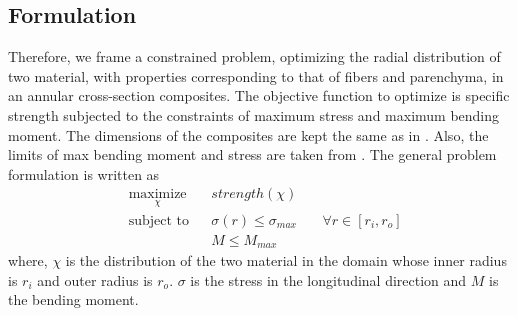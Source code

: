 \documentclass[10pt]{article}
\begin{document}
\subsection{Formulation}
Therefore, we frame a constrained problem, optimizing the radial distribution of two material, with properties corresponding to that of fibers and parenchyma, in an annular cross-section composites. The objective function to optimize is specific strength subjected to the constraints of maximum stress and maximum bending moment. The dimensions of the composites are kept the same as in \cite{mannan2018stiffness}. Also, the limits of max bending moment and stress are taken from \cite{mannan2018stiffness}. The general problem formulation is written as
\begin{equation*}
\begin{aligned}
& \underset{\chi}{\text{maximize}}
& & strength(\chi) \\
& \text{subject to}
& & \sigma(r) \leq \sigma_{max} &\quad \forall r \in [r_i, r_o]\\
& & & M \leq M_{max}
\end{aligned}
\end{equation*}
where, $\chi$ is the distribution of the two material in the domain whose inner radius is $r_i$ and outer radius is $r_o$.  $\sigma$ is the stress in the longitudinal direction and $M$ is the bending moment. \par
\end{document}
